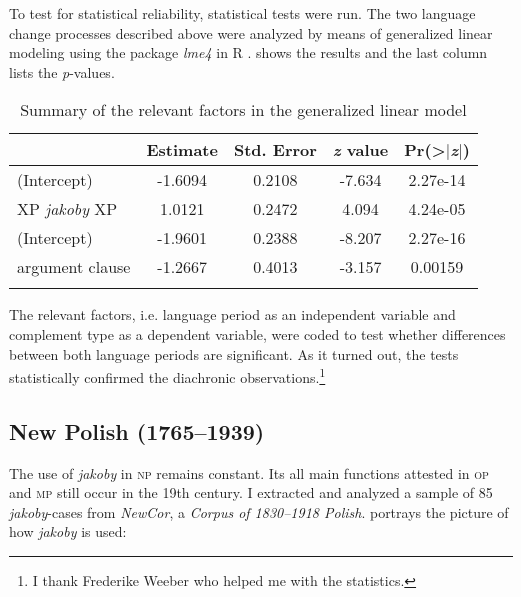 \documentclass[output=paper
,modfonts
,nonflat]{langsci/langscibook}
\begin{document}
To test for statistical reliability, statistical tests were run. The two language change processes described above were analyzed by means of generalized linear modeling using the package \emph{lme4} \citep{Bates-Maechler-etal2012} in R \citep{Team2012}.  shows the results and the last column lists the \emph{p}-values.

 \begin{table}[h] \begin{tabular}{l*{3}{S[table-format=-1.5]}S[table-format=1.2e4]}
\lsptoprule
{} & {Estimate} & {Std. Error} & {\emph{z} value} & {Pr(>$\mid$\emph{z}$\mid$)} \\
\midrule
(Intercept) & -1.6094 & 0.2108 & -7.634 & 2.27e-14 \\
XP \emph{jakoby} XP & 1.0121 & 0.2472 & 4.094 & 4.24e-05 \\
(Intercept) & -1.9601 & 0.2388 & -8.207 & 2.27e-16 \\
argument clause & -1.2667 & 0.4013 & -3.157 & 0.00159 \\
 \lspbottomrule
\end{tabular}
\caption{Summary of the relevant factors in the generalized linear model} \label{static}
\end{table}

\noindent  The relevant factors, i.e. language period as an independent variable and complement type as a dependent variable, were coded to test whether differences between both language periods are significant. As it turned out, the tests statistically confirmed the diachronic observations.\footnote{I thank Frederike Weeber who helped me with the statistics.
}

\subsection{New Polish (1765--1939)}

The use of \emph{jakoby} in \textsc{np} remains constant. Its all main functions attested in \textsc{op} and \textsc{mp} still occur in the 19th century. I extracted and analyzed a sample of 85 \emph{jakoby}-cases from \emph{NewCor}, a \emph{Corpus of 1830--1918 Polish}.  portrays the picture of how \emph{jakoby} is used:

\begin{table}[h]
\caption{The use of \emph{jakoby} in the \emph{NewCor} corpus} \label{nowopolski_statystka}
\end{table}
\end{document}
